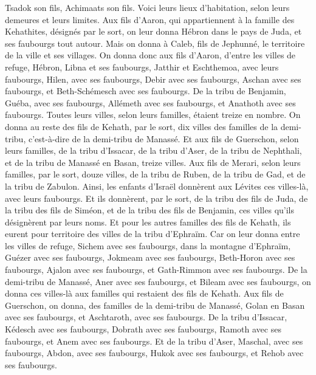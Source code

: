 \begin{multicols}{2}
Tsadok son fils, Achimaats son fils.
Voici leurs lieux d'habitation, selon leurs demeures et leurs limites. Aux fils d'Aaron, qui appartiennent à la famille des Kehathites, désignés par le sort,
on leur donna Hébron dans le pays de Juda, et ses faubourgs tout autour.
Mais on donna à Caleb, fils de Jephunné, le territoire de la ville et ses villages.
On donna donc aux fils d'Aaron, d'entre les villes de refuge, Hébron, Libna et ses faubourgs, Jatthir et Eschthemoa, avec leurs faubourgs,
Hilen, avec ses faubourgs, Debir avec ses faubourgs,
Aschan avec ses faubourgs, et Beth-Schémesch avec ses faubourgs.
De la tribu de Benjamin, Guéba, avec ses faubourgs, Allémeth avec ses faubourgs, et Anathoth avec ses faubourgs. Toutes leurs villes, selon leurs familles, étaient treize en nombre.
On donna au reste des fils de Kehath, par le sort, dix villes des familles de la demi-tribu, c'est-à-dire de la demi-tribu de Manassé.
Et aux fils de Guerschon, selon leurs familles, de la tribu d'Issacar, de la tribu d'Aser, de la tribu de Nephthali, et de la tribu de Manassé en Basan, treize villes.
Aux fils de Merari, selon leurs familles, par le sort, douze villes, de la tribu de Ruben, de la tribu de Gad, et de la tribu de Zabulon.
Ainsi, les enfants d'Israël donnèrent aux Lévites ces villes-là, avec leurs faubourgs.
Et ils donnèrent, par le sort, de la tribu des fils de Juda, de la tribu des fils de Siméon, et de la tribu des fils de Benjamin, ces villes qu'ils désignèrent par leurs noms.
Et pour les autres familles des fils de Kehath, ils eurent pour territoire des villes de la tribu d'Ephraïm.
Car on leur donna entre les villes de refuge, Sichem avec ses faubourgs, dans la montagne d'Ephraïm, Guézer avec ses faubourgs,
Jokmeam avec ses faubourgs, Beth-Horon avec ses faubourgs,
Ajalon avec ses faubourgs, et Gath-Rimmon avec ses faubourgs.
De la demi-tribu de Manassé, Aner avec ses faubourgs, et Bileam avec ses faubourgs, on donna ces villes-là aux familles qui restaient des fils de Kehath.
Aux fils de Guerschon, on donna, des familles de la demi-tribu de Manassé, Golan en Basan avec ses faubourgs, et Aschtaroth, avec ses faubourgs.
De la tribu d'Issacar, Kédesch avec ses faubourgs, Dobrath avec ses faubourgs,
Ramoth avec ses faubourgs, et Anem avec ses faubourgs.
Et de la tribu d'Aser, Maschal, avec ses faubourgs, Abdon, avec ses faubourgs,
Hukok avec ses faubourgs, et Rehob avec ses faubourgs.

\end{multicols}
